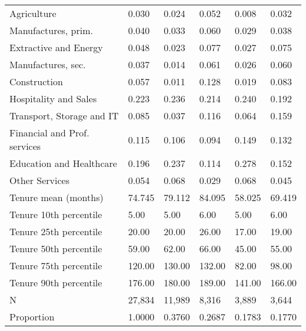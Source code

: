 \begin{tabular}{llllll}
Agriculture                  &   0.030 &   0.024 &   0.052 &              0.008 &            0.032 \\
Manufactures, prim.          &   0.040 &   0.033 &   0.060 &              0.029 &            0.038 \\
Extractive and Energy        &   0.048 &   0.023 &   0.077 &              0.027 &            0.075 \\
Manufactures, sec.           &   0.037 &   0.014 &   0.061 &              0.026 &            0.060 \\
Construction                 &   0.057 &   0.011 &   0.128 &              0.019 &            0.083 \\
Hospitality and Sales        &   0.223 &   0.236 &   0.214 &              0.240 &            0.192 \\
Transport, Storage and IT    &   0.085 &   0.037 &   0.116 &              0.064 &            0.159 \\
Financial and Prof. services &   0.115 &   0.106 &   0.094 &              0.149 &            0.132 \\
Education and Healthcare     &   0.196 &   0.237 &   0.114 &              0.278 &            0.152 \\
Other Services               &   0.054 &   0.068 &   0.029 &              0.068 &            0.045 \\
Tenure mean (months)         &  74.745 &  79.112 &  84.095 &             58.025 &           69.419 \\
Tenure 10th percentile       &    5.00 &    5.00 &    6.00 &               5.00 &             6.00 \\
Tenure 25th percentile       &   20.00 &   20.00 &   26.00 &              17.00 &            19.00 \\
Tenure 50th percentile       &   59.00 &   62.00 &   66.00 &              45.00 &            55.00 \\
Tenure 75th percentile       &  120.00 &  130.00 &  132.00 &              82.00 &            98.00 \\
Tenure 90th percentile       &  176.00 &  180.00 &  189.00 &             141.00 &           166.00 \\
N                            &  27,834 &  11,989 &   8,316 &              3,889 &            3,644 \\
Proportion                   &  1.0000 &  0.3760 &  0.2687 &             0.1783 &           0.1770 \\
\bottomrule
\end{tabular}
